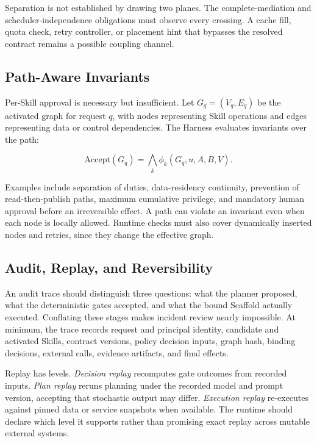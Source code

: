 Separation is not established by drawing two planes. The complete-mediation and scheduler-independence obligations must observe every crossing. A cache fill, quota check, retry controller, or placement hint that bypasses the resolved contract remains a possible coupling channel.

\subsection{Path-Aware Invariants}

Per-Skill approval is necessary but insufficient. Let $G_q=(V_q,E_q)$ be the activated graph for request $q$, with nodes representing Skill operations and edges representing data or control dependencies. The Harness evaluates invariants over the path:

\begin{equation}
\mathrm{Accept}(G_q)=\bigwedge_k \phi_k(G_q,u,A,B,V).
\end{equation}

Examples include separation of duties, data-residency continuity, prevention of read-then-publish paths, maximum cumulative privilege, and mandatory human approval before an irreversible effect. A path can violate an invariant even when each node is locally allowed. Runtime checks must also cover dynamically inserted nodes and retries, since they change the effective graph.

\subsection{Audit, Replay, and Reversibility}

An audit trace should distinguish three questions: what the planner proposed, what the deterministic gates accepted, and what the bound Scaffold actually executed. Conflating these stages makes incident review nearly impossible. At minimum, the trace records request and principal identity, candidate and activated Skills, contract versions, policy decision inputs, graph hash, binding decisions, external calls, evidence artifacts, and final effects.

Replay has levels. \textit{Decision replay} recomputes gate outcomes from recorded inputs. \textit{Plan replay} reruns planning under the recorded model and prompt version, accepting that stochastic output may differ. \textit{Execution replay} re-executes against pinned data or service snapshots when available. The runtime should declare which level it supports rather than promising exact replay across mutable external systems.

